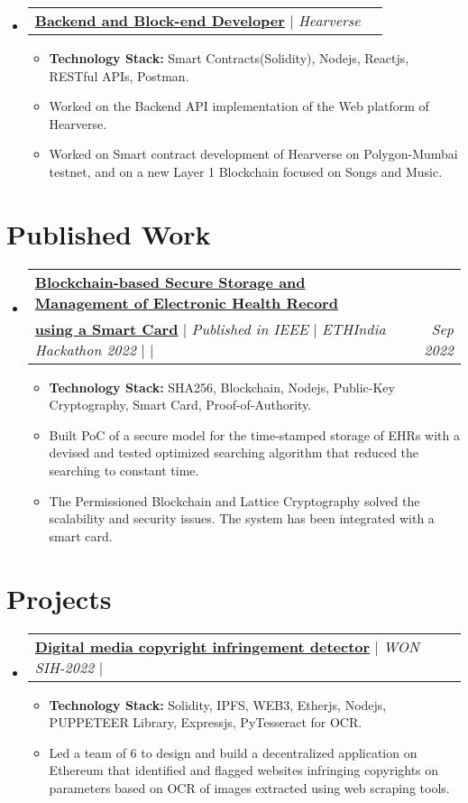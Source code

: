 \documentclass[a4paper]{article}
\makeatletter
\newcommand{\resumeItemWithoutTitle}[1]{
  \item\small{
    {#1 \vspace{-2pt}}
      {\vspace{-2pt}}
  }
}
\newcommand{\resumeSubheadingPro}[2]{
  \vspace{-1pt}\item
  \begin{tabular*}{0.97\textwidth}{l@{\extracolsep{\fill}}r}
    #1 & {\textit {\small{#2}}} \\
  \end{tabular*}\vspace{-5pt}
}
\newcommand{\resumeSubHeadingListStart}{\begin{itemize}[leftmargin=*,
      label={}]}
\newcommand{\resumeSubHeadingListEnd}{\end{itemize}}
\newcommand{\resumeItemListStart}{\begin{itemize}}
\newcommand{\resumeItemListEnd}{\end{itemize}\vspace{-5pt}}
\makeatother
\begin{document}
\resumeSubHeadingListStart
\resumeSubheadingPro
{\href{}{{\textbf{Backend and Block-end Developer}}}	  $|$ \emph{Hearverse}
  \href{}{}}{}
\resumeItemListStart
\resumeItemWithoutTitle
{\textbf{Technology Stack:} Smart Contracts(Solidity), Nodejs, Reactjs, RESTful
  APIs, Postman.}
\resumeItemWithoutTitle
{
  Worked on the Backend API implementation of the Web platform of
  Hearverse.
}
\resumeItemWithoutTitle
{Worked on Smart contract development of Hearverse on Polygon-Mumbai testnet,
  and on a new Layer 1 Blockchain focused on Songs and Music.}

\resumeItemListEnd
\resumeSubHeadingListEnd

\section{Published Work}
\resumeSubHeadingListStart

\resumeSubheadingPro
{\href{https://github.com/Aryamanraj/ethindiaApi}{{\textbf{Blockchain-based
        Secure Storage and Management of Electronic Health Record}}} \\
{\href{https://github.com/Aryamanraj/ethindiaApi}{{\textbf{using a Smart
        Card}}}} $|$ \emph{Published in IEEE} $|$ \emph{ETHIndia Hackathon 2022} $|$
\href{https://github.com/Aryamanraj/ethindiaApi}{\faIcon{github}} $|$
\href{https://ieeexplore.ieee.org/document/10126943/}{\faIcon{link}}}{Sep 2022}
\resumeItemListStart
\resumeItemWithoutTitle
{\textbf{Technology Stack:} SHA256, Blockchain, Nodejs, Public-Key
  Cryptography, Smart Card, Proof-of-Authority.}
\resumeItemWithoutTitle
{Built PoC of a secure model for the time-stamped storage of EHRs with a
  devised and tested optimized searching algorithm that reduced the searching to
  constant time.}
\resumeItemWithoutTitle
{The Permissioned Blockchain and Lattice Cryptography solved the scalability
  and security issues. The system has been integrated with a smart card.}
\resumeItemListEnd
\resumeSubHeadingListEnd

\section{Projects}
\resumeSubHeadingListStart
\resumeSubheadingPro
{\href{https://github.com/Aryamanraj/enigma/}{{\textbf{Digital media copyright
          infringement detector}}} $|$ \emph{WON SIH-2022} $|$
  \href{https://github.com/Aryamanraj/enigma}{\faIcon{github}}}{}
\resumeItemListStart
\resumeItemWithoutTitle
{\textbf{Technology Stack:} Solidity, IPFS, WEB3, Etherjs, Nodejs, PUPPETEER
  Library, Expressjs, PyTesseract for OCR.}
\resumeItemWithoutTitle
{Led a team of 6 to design and build a decentralized application on Ethereum
  that identified and flagged websites infringing copyrights on parameters based
  on OCR of images extracted using web scraping tools.}
\resumeItemListEnd
\resumeSubHeadingListEnd
\end{document}
